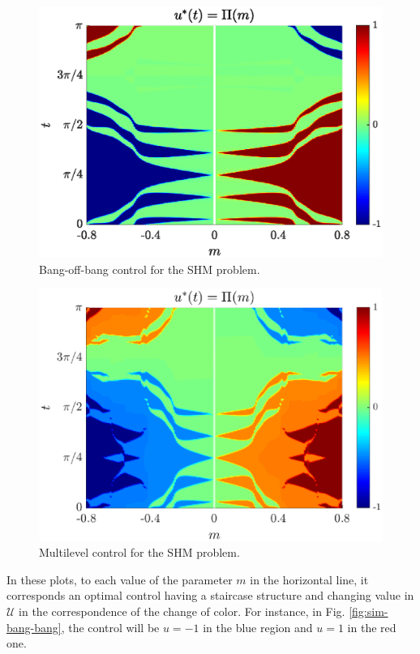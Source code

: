 \documentclass[twocolumn]{autart}    %
\begin{document}
\begin{figure}[ht!]
    \hspace{0.05em}
    \includegraphics[scale=0.525]{img/fig06.eps}
    \caption{Bang-off-bang control for the SHM problem.}\label{fig:sim-bang-off-bang}
\end{figure} 

\begin{figure}[ht!]
    \hspace{0.05em}
    \includegraphics[scale=0.525]{img/fig08.eps}
    \caption{Multilevel control for the SHM problem.}
    \label{fig:sim-multi-level}
\end{figure} 

In these plots, to each value of the parameter $m$ in the horizontal line, it corresponds an optimal control having a staircase structure and changing value in $\mathcal U$ in the correspondence of the change of color. For instance, in Fig. \ref{fig:sim-bang-bang}, the control will be $u=-1$ in the blue region and $u=1$ in the red one.
\end{document}
